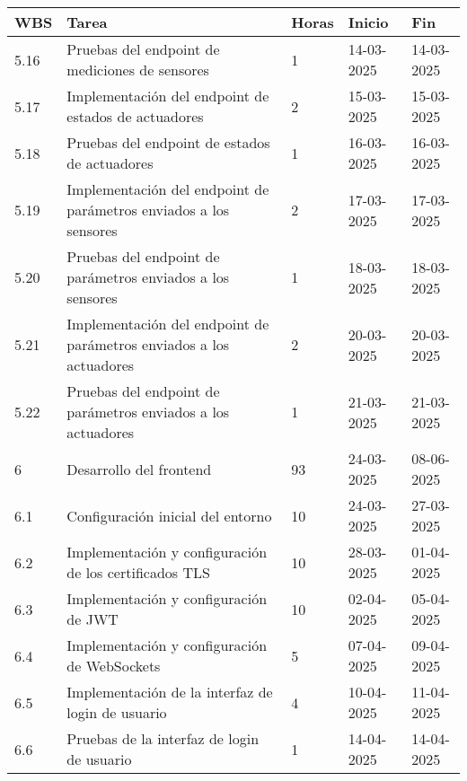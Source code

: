 \begin{table}[ht]
	\begin{tabularx}{\linewidth}{|p{1cm}|p{10cm}|p{1cm}|p{1.8cm}|p{1.8cm}|}
		\hline
		\rowcolor[HTML]{C0C0C0}
		WBS   & Tarea                                                                 & Horas & Inicio     & Fin        \\ \hline
		5.16  & Pruebas del endpoint de mediciones de sensores                        & 1     & 14-03-2025 & 14-03-2025 \\ \hline
		5.17  & Implementación del endpoint de estados de actuadores                  & 2     & 15-03-2025 & 15-03-2025 \\ \hline
		5.18  & Pruebas del endpoint de estados de actuadores                         & 1     & 16-03-2025 & 16-03-2025 \\ \hline
		5.19  & Implementación del endpoint de parámetros enviados a los sensores     & 2     & 17-03-2025 & 17-03-2025 \\ \hline
		5.20  & Pruebas del endpoint de parámetros enviados a los sensores            & 1     & 18-03-2025 & 18-03-2025 \\ \hline
		5.21  & Implementación del endpoint de parámetros enviados a los actuadores   & 2     & 20-03-2025 & 20-03-2025 \\ \hline
		5.22  & Pruebas del endpoint de parámetros enviados a los actuadores          & 1     & 21-03-2025 & 21-03-2025 \\ \hline
		6     & Desarrollo del frontend                                               & 93    & 24-03-2025 & 08-06-2025 \\ \hline
		6.1   & Configuración inicial del entorno                                     & 10    & 24-03-2025 & 27-03-2025 \\ \hline
		6.2   & Implementación y configuración de los certificados TLS                & 10    & 28-03-2025 & 01-04-2025 \\ \hline
		6.3   & Implementación y configuración de JWT                                 & 10    & 02-04-2025 & 05-04-2025 \\ \hline
		6.4   & Implementación y configuración de WebSockets                          & 5     & 07-04-2025 & 09-04-2025 \\ \hline
		6.5   & Implementación de la interfaz de login de usuario                     & 4     & 10-04-2025 & 11-04-2025 \\ \hline
		6.6   & Pruebas de la interfaz de login de usuario                            & 1     & 14-04-2025 & 14-04-2025 \\ \hline

\end{tabularx}
\end{table}
